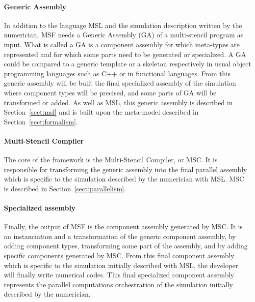 \paragraph{\textbf{Generic Assembly}}
In addition to the language MSL and the simulation description written by the numerician, MSF needs a Generic Assembly (GA) of a multi-stencil program as input. What is called a GA is a component assembly for which meta-types are represented and for which some parts need to be generated or specialized. A GA could be compared to a generic template or a skeleton respectively in usual object programming languages such as C++ or in functional languages. From this generic assembly will be built the final specialized assembly of the simulation where component types will be precised, and some parts of GA will be transformed or added. As well as MSL, this generic assembly is described in Section~\ref{sect:msl} and is built upon the meta-model described in Section~\ref{sect:formalism}.

\paragraph{\textbf{Multi-Stencil Compiler}}
The core of the framework is the Multi-Stencil Compiler, or MSC. It is responsible for transforming the generic assembly into the final parallel assembly which is specific to the simulation described by the numerician with MSL. MSC is described in Section~\ref{sect:parallelism}.

\paragraph{\textbf{Specialized assembly}}
Finally, the output of MSF is the component assembly generated by MSC. It is an instanciation and a transformation of the generic component assembly, by adding component types, transforming some part of the assembly, and by adding specific components generated by MSC. From this final component assembly which is specific to the simulation initially described with MSL, the developer will finally write numerical codes. This final specialized component assembly represents the parallel computations orchestration of the simulation initially described by the numerician.
